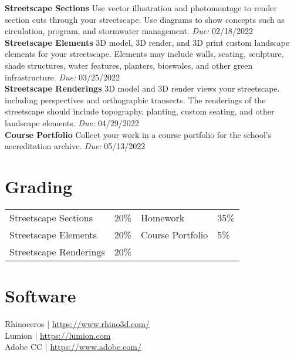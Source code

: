 \documentclass[11pt,article,oneside]{memoir}
\begin{document}
\noindent \textbf{Streetscape Sections}
Use vector illustration and photomontage
to render section cuts through your streetscape. 
Use diagrams to show concepts such as 
circulation, program, and stormwater management.
\emph{Due:} 02/18/2022\\

\noindent \textbf{Streetscape Elements}
3D model, 3D render, and 3D print
custom landscape elements for your streetscape.
Elements may include 
walls, seating, sculpture, shade structures,
water features, planters, bioswales, and
other green infrastructure.
\emph{Due:} 03/25/2022\\

\noindent \textbf{Streetscape Renderings}
3D model and 3D render views your streetscape.
including perspectives and orthographic transects.
The renderings of the streetscape should include 
topography, planting, custom seating, 
and other landscape elements.
\emph{Due:} 04/29/2022\\

\noindent \textbf{Course Portfolio}
Collect your work in a course portfolio
for the school's accreditation archive.
\emph{Due:} 05/13/2022\\

\section{Grading}

\begin{table}[H]
\begin{tabular}{l r @{\hskip 2cm} l @{\hskip 0.5cm} l}
Streetscape Sections & 20\% & Homework & 35\%\\
Streetscape Elements & 20\% & Course Portfolio & 5\% \\
Streetscape Renderings & 20\%\\

\end{tabular}
\end{table}

\section{Software}
\begin{multicols}{2}
\raggedright
Rhinoceros | \url{https://www.rhino3d.com/}\\
Lumion | \url{https://lumion.com}\\
Adobe CC | \url{https://www.adobe.com/}\\
\end{multicols}
\end{document}
